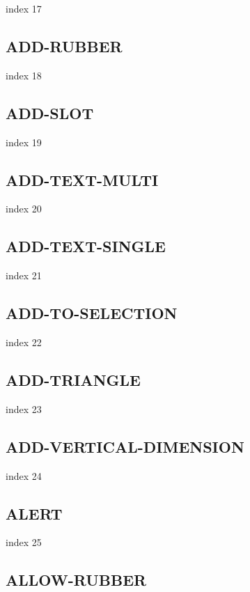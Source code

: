 \documentclass[11pt]{report}
\begin{document}
index 17

\subsection{ADD-RUBBER}

index 18

\subsection{ADD-SLOT}

index 19

\subsection{ADD-TEXT-MULTI}

index 20

\subsection{ADD-TEXT-SINGLE}

index 21

\subsection{ADD-TO-SELECTION}

index 22

\subsection{ADD-TRIANGLE}

index 23

\subsection{ADD-VERTICAL-DIMENSION}

index 24

\subsection{ALERT}

index 25

\subsection{ALLOW-RUBBER}
\end{document}

